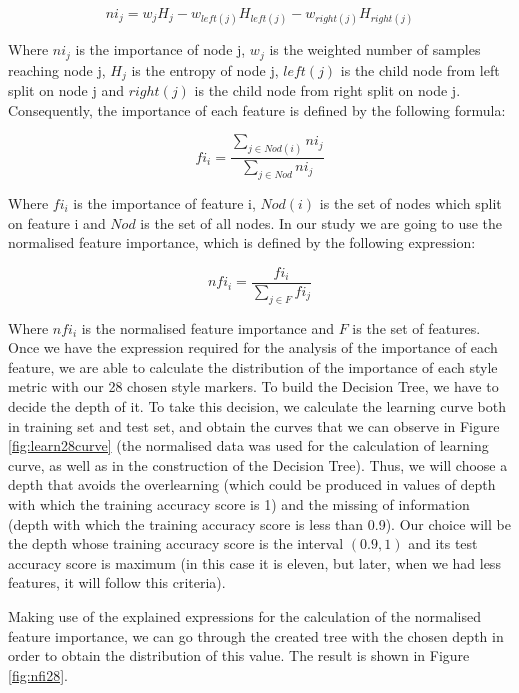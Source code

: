 $$
ni_j = w_jH_j - w_{left(j)}H_{left(j)} - w_{right(j)}H_{right(j)}
$$

Where $ni_j$ is the importance of node j, $w_j$ is the weighted number of samples reaching node j, $H_j$ is the entropy of node j, $left(j)$ is the child node from left split on node j and $right(j)$ is the child node from right split on node j. Consequently, the importance of each feature is defined by the following formula:

$$
fi_i = \frac{\sum_{j\in Nod(i)}ni_j}{\sum_{j\in Nod}ni_j}
$$

Where $fi_i$ is the importance of feature i, $Nod(i)$ is the set of nodes which split on feature i and $Nod$ is the set of all nodes. In our study we are going to use the normalised feature importance, which is defined by the following expression:

$$
nfi_i=\frac{fi_i}{\sum_{j\in F}fi_j}
$$

Where $nfi_i$ is the normalised feature importance and $F$ is the set of features. Once we have the expression required for the analysis of the importance of each feature, we are able to calculate the distribution of the importance of each style metric with our 28 chosen style markers. To build the Decision Tree, we have to decide the depth of it. To take this decision, we calculate the learning curve both in training set and test set, and obtain the curves that we can observe in Figure \ref{fig:learn28curve} (the normalised data was used for the calculation of learning curve, as well as in the construction of the Decision Tree). Thus, we will choose a depth that avoids the overlearning (which could be produced in values of depth with which the training accuracy score is 1) and the missing of information (depth with which the training accuracy score is less than 0.9). Our choice will be the depth whose training accuracy score is the interval $(0.9, 1)$ and its test accuracy score is maximum (in this case it is eleven, but later, when we had less features, it will follow this criteria).

Making use of the explained expressions for the calculation of the normalised feature importance, we can go through the created tree with the chosen depth in order to obtain the distribution of this value. The result is shown in Figure \ref{fig:nfi28}.

